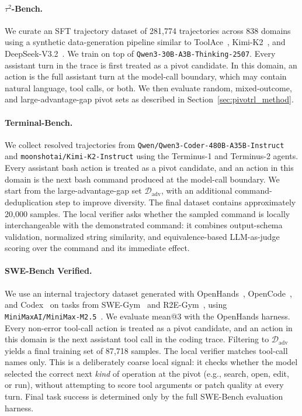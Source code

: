 \paragraph{$\tau^2$-Bench.}
We curate an SFT trajectory dataset of 281{,}774 trajectories across 838 domains using a synthetic data-generation pipeline similar to ToolAce~\citep{liu2025toolacewinningpointsllm}, Kimi-K2~\citep{kimiteam2025kimik2openagentic}, and DeepSeek-V3.2~\citep{deepseekai2025deepseekv32pushingfrontieropen}. We train on top of \texttt{Qwen3-30B-A3B-Thinking-2507}. Every assistant turn in the trace is first treated as a pivot candidate. In this domain, an action is the full assistant turn at the model-call boundary, which may contain natural language, tool calls, or both. We then evaluate random, mixed-outcome, and large-advantage-gap pivot sets as described in Section~\ref{sec:pivotrl_method}.

\paragraph{Terminal-Bench.}
We collect resolved trajectories from \texttt{Qwen/Qwen3-Coder-480B-A35B-Instruct} and \texttt{moonshotai/Kimi-K2-Instruct} using the Terminus-1 and Terminus-2 agents. Every assistant bash action is treated as a pivot candidate, and an action in this domain is the next bash command produced at the model-call boundary. We start from the large-advantage-gap set $\mathcal{D}_{\mathrm{adv}}$, with an additional command-deduplication step to improve diversity. The final dataset contains approximately 20{,}000 samples. The local verifier asks whether the sampled command is locally interchangeable with the demonstrated command: it combines output-schema validation, normalized string similarity, and equivalence-based LLM-as-judge scoring over the command and its immediate effect.

\paragraph{SWE-Bench Verified.}
We use an internal trajectory dataset generated with OpenHands~\citep{wang2025openhandsopenplatformai}, OpenCode~\citep{opencode}, and Codex~\citep{openaicodex_software} on tasks from SWE-Gym~\citep{pan2025trainingsoftwareengineeringagents} and R2E-Gym~\citep{jain2025r2egymproceduralenvironmentshybrid}, using \texttt{MiniMaxAI/MiniMax-M2.5}~\citep{minimax2026m25}. We evaluate mean@3 with the OpenHands harness. Every non-error tool-call action is treated as a pivot candidate, and an action in this domain is the next assistant tool call in the coding trace. Filtering to $\mathcal{D}_{\mathrm{adv}}$ yields a final training set of 87{,}718 samples. The local verifier matches tool-call names only. This is a deliberately coarse local signal: it checks whether the model selected the correct next \emph{kind} of operation at the pivot (e.g., search, open, edit, or run), without attempting to score tool arguments or patch quality at every turn. Final task success is determined only by the full SWE-Bench evaluation harness.

